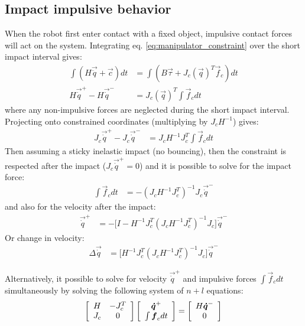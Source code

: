 \subsection{Impact impulsive behavior}
\label{sec:impact}
%
When the robot first enter contact with a fixed object, impulsive contact forces will act on the system. Integrating eq. \eqref{eq:manipulator_constraint} over the short impact interval gives:
%
\begin{align}
\int{ ( H \vec{\ddot{q}} + \vec{c} ) dt } &= \int{ ( B \vec{\tau} + J_c( \vec{ q } )^T  \vec{f}_c ) dt } \\
H \vec{\dot{q}}^+ - H \vec{\dot{q}}^- &= J_c( \vec{ q } )^T  \int{  \vec{f}_c dt }
\label{eq:manipulator_impact}
\end{align}
%
where any non-impulsive forces are neglected during the short impact interval. Projecting onto constrained coordinates (multiplying by $J_c H^{-1}$) gives:
%
\begin{align}
J_c \vec{\dot{q}}^+ - J_c \vec{\dot{q}}^- &= J_c H^{-1} J_c^T  \int{  \vec{f}_c dt }
\label{eq:manipulator_impact2}
\end{align}
%
Then assuming a sticky inelastic impact (no bouncing), then the constraint is respected after the impact ($J_c \vec{\dot{q}}^+=0$) and it is possible to solve for the impact force:
%
\begin{align}
\int{  \vec{f}_c dt } &= - \left( J_c H^{-1} J_c^T \right)^{-1}  J_c \vec{\dot{q}}^-
\label{eq:manipulator_impact_force}
\end{align}
%
and also for the velocity after the impact:
%
\begin{align}
\vec{\dot{q}}^+ &= - \Big[ I - H^{-1} J_c^T \left( J_c H^{-1} J_c^T \right)^{-1} J_c \Big] \vec{\dot{q}}^-
\label{eq:manipulator_impact_velocity}
\end{align}
%
Or change in velocity:
%
\begin{align}
\Delta \vec{\dot{q}} &=  \Big[ H^{-1} J_c^T \left( J_c H^{-1} J_c^T \right)^{-1} J_c \Big] \vec{\dot{q}}^-
\label{eq:manipulator_impact_velocity_delta}
\end{align}
%

Alternatively, it possible to solve for velocity $\vec{\dot{q}}^+$ and impulsive forces $\int{ \vec{f}_c dt }$ simultaneously by solving the following system of $n+l$ equations:
%
\begin{align}
\left[ \begin{array}{c c } 	H & -J_c^T  \\ J_c 	& 0  	\end{array} \right] \left[ \begin{array}{c} \vec{\dot{q}}^+  \\ \int{ \vec{f}_c dt }\end{array} \right] = \left[ \begin{array}{c}  	H \vec{\dot{q}}^-   \\ 0  \end{array} \right]
\label{eq:manipulator_impact_eom}
\end{align}


